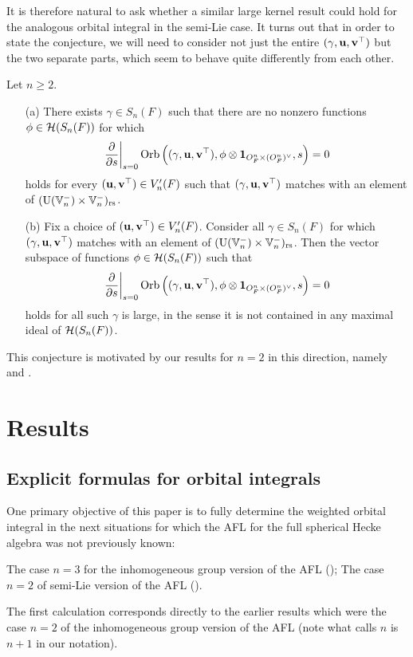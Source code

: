 It is therefore natural to ask whether a similar large kernel result
could hold for the analogous orbital integral in the semi-Lie case.
It turns out that in order to state the conjecture,
we will need to consider not just the entire ${(\gamma, \mathbf u, \mathbf v^\top)}$
but the two separate parts, which seem to behave quite differently from each other.
\begin{conjecture}
  \label{conj:kernel_semi_lie}
  Let $n \ge 2$.
  \begin{enumerate}
  \item[(a)]
  There exists $\gamma \in S_n(F)$ such that there are
  no nonzero functions $\phi \in \mathcal H(S_n(F))$ for which
  \[ \left. \pdv{}{s} \right\rvert_{s=0}
    \operatorname{Orb} \left({(\gamma, \mathbf u, \mathbf v^\top)}, \phi \otimes \mathbf{1}_{O_F^n \times (O_F^n)^\vee}, s \right) = 0 \]
  holds for every $(\mathbf u, \mathbf v^\top) \in V'_n(F)$
  such that ${(\gamma, \mathbf u, \mathbf v^\top)}$ matches with an element of $(\operatorname{U}(\mathbb V_n^-) \times \mathbb V_n^-)_{\mathrm{rs}}$.

  \item[(b)]
  Fix a choice of $(\mathbf u, \mathbf v^\top) \in V'_n(F)$.
  Consider all $\gamma \in S_n(F)$ for which ${(\gamma, \mathbf u, \mathbf v^\top)}$
  matches with an element of $(\operatorname{U}(\mathbb V_n^-) \times \mathbb V_n^-)_{\mathrm{rs}}$.
  Then the vector subspace of functions $\phi \in \mathcal H(S_n(F))$ such that
  \[
    \left. \pdv{}{s} \right\rvert_{s=0}
    \operatorname{Orb} \left( {(\gamma, \mathbf u, \mathbf v^\top)}, \phi \otimes \mathbf{1}_{O_F^n \times (O_F^n)^\vee}, s \right) = 0
  \]
  holds for all such $\gamma$ is large,
  in the sense it is not contained in any maximal ideal of $\mathcal H(S_n(F))$.
  \end{enumerate}
\end{conjecture}
This conjecture is motivated by our results for $n = 2$ in this direction,
namely  and .

\section{Results}
\subsection{Explicit formulas for orbital integrals}
One primary objective of this paper is to fully determine the weighted orbital integral
in the next situations for which the AFL for the full spherical Hecke algebra
was not previously known:
\begin{itemize}
  \ii The case $n = 3$ for the inhomogeneous group version of the AFL ();
  \ii The case $n = 2$ of semi-Lie version of the AFL ().
\end{itemize}
The first calculation corresponds directly to the earlier results
\cite[Lemma 7.1.1 and Proposition 7.3.2]{ref:AFLspherical}
which were the case $n = 2$ of the inhomogeneous group version of the AFL
(note what \cite{ref:AFLspherical} calls $n$ is $n+1$ in our notation).

